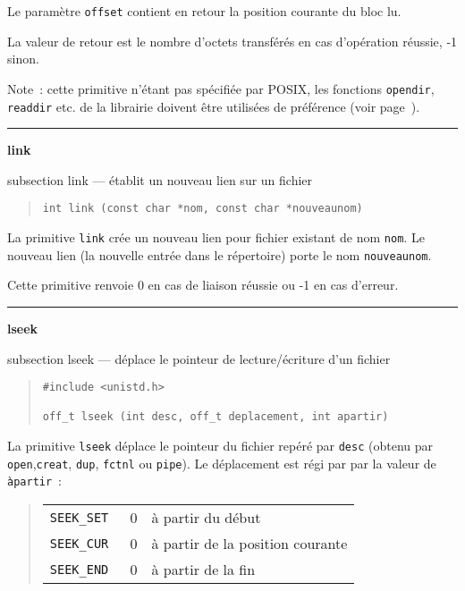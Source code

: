 \documentclass [twoside] {report}
\newcommand {\primitive} [1]
    {
	\phantomsection
	{\large \bf #1}
	\addcontentsline {toc} {subsection} {#1}
    }
\newcommand {\separation}
    {
	\vspace {5mm}
	\nopagebreak
	\hrule
    }
\begin{document}
Le paramètre {\tt offset} contient en retour la position courante du bloc
lu.

La valeur de retour est le nombre d'octets transférés en cas d'opération
réussie, -1 sinon.

Note~:  cette primitive n'étant pas spécifiée par POSIX, les
fonctions {\tt opendir}, {\tt readdir} etc.  de la librairie doivent
être utilisées de préférence (voir page~\pageref {opendir}).


\separation
\primitive {link} --- établit un nouveau lien sur un fichier

\begin {quote}
\begin {verbatim}
int link (const char *nom, const char *nouveaunom)
\end{verbatim}
\end {quote}

La primitive {\tt link} crée un nouveau lien pour
fichier existant de nom {\tt nom}. Le nouveau lien
(la nouvelle entrée dans le répertoire) porte
le nom {\tt nouveaunom}.

Cette primitive renvoie 0 en cas de liaison
réussie ou -1 en cas d'erreur.




\separation
\primitive {lseek} --- déplace le pointeur de lecture/écriture d'un fichier

\begin {quote}
\begin {verbatim}
#include <unistd.h>

off_t lseek (int desc, off_t deplacement, int apartir)
\end{verbatim}
\end {quote}

La primitive {\tt lseek} déplace le pointeur du
fichier repéré par {\tt desc} (obtenu par
{\tt open},{\tt creat}, {\tt dup}, {\tt fctnl} ou {\tt pipe}).
Le déplacement est régi par par la valeur de
{\tt àpartir}~:

\begin {quote}
    \begin {tabular} {|lll|} \hline
	\tt SEEK\_SET & 0 & à partir du début \\
	\tt SEEK\_CUR & 0 & à partir de la position courante \\
	\tt SEEK\_END & 0 & à partir de la fin \\ \hline
    \end {tabular}
\end {quote}
\end{document}
